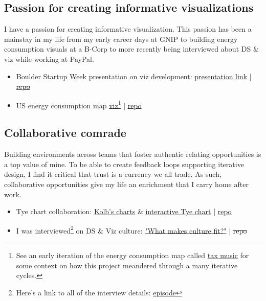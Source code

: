 \documentclass[11pt]{article}
\begin{document}
\subsection{Passion for creating informative visualizations}\label{sec:culture}
I have a passion for creating informative visualization. This passion has been a mainstay in my life from my early career days at GNIP to building energy consumption visuals at a B-Corp to more recently being interviewed about DS \& viz while working at PayPal. 

\begin{itemize}
	\item Boulder Startup Week presentation on viz development:  \href{https://blehman.github.io/2015-05-13\_BSW\_DataViz\_Lecture/\#/}{presentation link} | \sout{ \href{https://github.com/blehman/2015-05-13_BSW_DataViz_Lecture/tree/master}{repo} }
	\item US energy consumption map \href{https://blehman.github.io/wmo_map/}{viz}\footnote{See an early iteration of the energy consumption map called \href{https://blehman.github.io/tax_story/tax_sounds/}{tax music} for some context on how this project meandered through a many iterative cycles.} |  \href{https://github.com/blehman/wmo_map/tree/gh-pages}{repo} 
	
\end{itemize}


\subsection{Collaborative comrade}\label{sec:learner}
Building environments across teams that foster authentic relating opportunities is a top value of mine. To be able to create feedback loops supporting iterative design, I find it critical that trust is a currency we all trade. As such, collaborative opportunities give my life an enrichment that I carry home after work.  
 \begin{itemize}
 	\item Tye chart collaboration:  \href{https://github.com/twitterdev/Gnip-Trend-Detection}{Kolb's charts} \& \href{https://blehman.github.io/trend\_detection\_graph/}{interactive Tye chart} | \href{https://github.com/blehman/trend\_detection\_graph}{repo}
	\item I was interviewed\footnote{Here's a link to all of the interview details: \href{https://powderkeg.com/the-power-of-data-science-and-visualization-with-brian-lehman-of-honey/}{episode}} on DS \& Viz culture:  \href{https://www.youtube.com/watch?v=uIOiEL5aUe0&t=20m57s}{"What makes culture fit?"}  | \sout{repo}
 \end{itemize}
\end{document}
